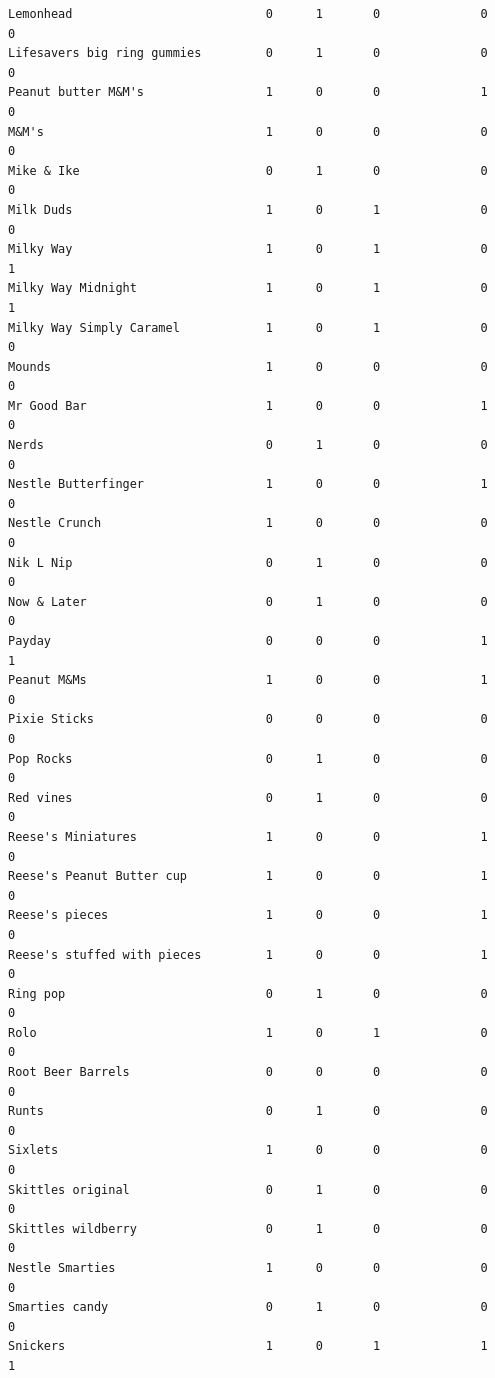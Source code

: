 \documentclass[
  letterpaper,
  DIV=11,
  numbers=noendperiod]{scrartcl}
\begin{document}
\begin{verbatim}
Lemonhead                           0      1       0              0      0
Lifesavers big ring gummies         0      1       0              0      0
Peanut butter M&M's                 1      0       0              1      0
M&M's                               1      0       0              0      0
Mike & Ike                          0      1       0              0      0
Milk Duds                           1      0       1              0      0
Milky Way                           1      0       1              0      1
Milky Way Midnight                  1      0       1              0      1
Milky Way Simply Caramel            1      0       1              0      0
Mounds                              1      0       0              0      0
Mr Good Bar                         1      0       0              1      0
Nerds                               0      1       0              0      0
Nestle Butterfinger                 1      0       0              1      0
Nestle Crunch                       1      0       0              0      0
Nik L Nip                           0      1       0              0      0
Now & Later                         0      1       0              0      0
Payday                              0      0       0              1      1
Peanut M&Ms                         1      0       0              1      0
Pixie Sticks                        0      0       0              0      0
Pop Rocks                           0      1       0              0      0
Red vines                           0      1       0              0      0
Reese's Miniatures                  1      0       0              1      0
Reese's Peanut Butter cup           1      0       0              1      0
Reese's pieces                      1      0       0              1      0
Reese's stuffed with pieces         1      0       0              1      0
Ring pop                            0      1       0              0      0
Rolo                                1      0       1              0      0
Root Beer Barrels                   0      0       0              0      0
Runts                               0      1       0              0      0
Sixlets                             1      0       0              0      0
Skittles original                   0      1       0              0      0
Skittles wildberry                  0      1       0              0      0
Nestle Smarties                     1      0       0              0      0
Smarties candy                      0      1       0              0      0
Snickers                            1      0       1              1      1

\end{verbatim}
\end{document}
